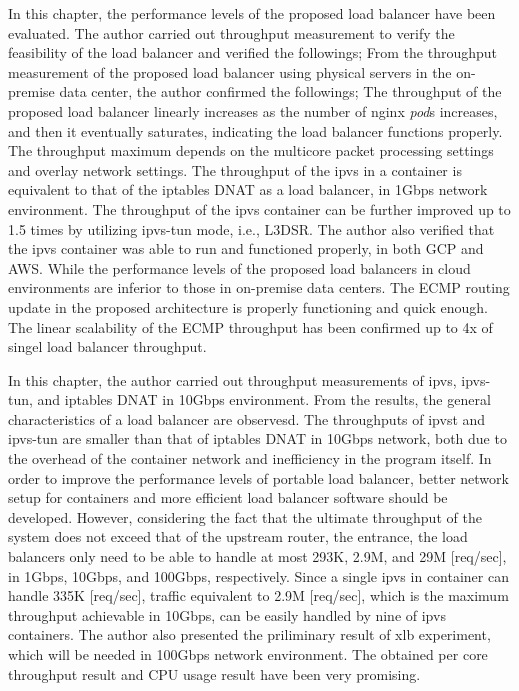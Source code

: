 In this chapter, the performance levels of the proposed load balancer have been evaluated.
The author carried out throughput measurement to verify the feasibility of the load balancer and verified the followings;
From the throughput measurement of the proposed load balancer using physical servers in the on-premise data center, the author confirmed the followings;
The throughput of the proposed load balancer linearly increases as the number of nginx {\em pod}s increases, and then it eventually saturates, indicating the load balancer functions properly.
The throughput maximum depends on the multicore packet processing settings and overlay network settings.
The throughput of the ipvs in a container is equivalent to that of the iptables DNAT as a load balancer, in 1Gbps network environment.
The throughput of the ipvs container can be further improved up to 1.5 times by utilizing ipvs-tun mode, i.e., L3DSR.
The author also verified that the ipvs container was able to run and functioned properly, in both GCP and AWS.
While the performance levels of the proposed load balancers in cloud environments are inferior to those in on-premise data centers.
The ECMP routing update in the proposed architecture is properly functioning and quick enough.
The linear scalability of the ECMP throughput has been confirmed up to 4x of singel load balancer throughput.

In this chapter, the author carried out throughput measurements of ipvs, ipvs-tun, and iptables DNAT in 10Gbps environment.
From the results, the general characteristics of a load balancer are observesd.
The throughputs of ipvst and ipvs-tun are smaller than that of iptables DNAT in 10Gbps network, both due to the overhead of the container network and inefficiency in the program itself.
In order to improve the performance levels of portable load balancer, better network setup for containers and more efficient load balancer software should be developed.
However, considering the fact that the ultimate throughput of the system does not exceed that of the upstream router, the entrance,
the load balancers only need to be able to handle at most 293K, 2.9M, and 29M [req/sec], in 1Gbps, 10Gbps, and 100Gbps, respectively.
Since a single ipvs in container can handle 335K [req/sec], traffic equivalent to 2.9M [req/sec], which is the maximum throughput achievable in 10Gbps, can be easily handled by nine of ipvs containers.
The author also presented the priliminary result of xlb experiment, which will be needed in 100Gbps network environment.
The obtained per core throughput result and CPU usage result have been very promising.


